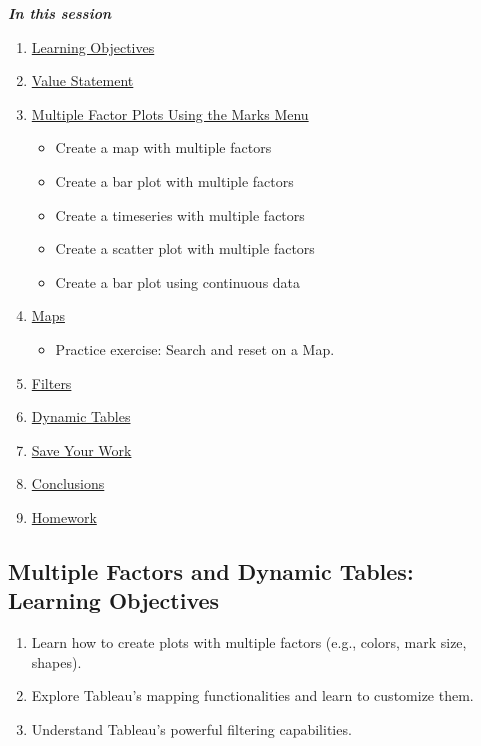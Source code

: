 \documentclass[
]{book}
\providecommand{\tightlist}{%
  \setlength{\itemsep}{0pt}\setlength{\parskip}{0pt}}
\begin{document}
\textbf{\emph{In this session }}

\begin{enumerate}
\def\labelenumi{\arabic{enumi}.}
\tightlist
\item
  \protect\hyperlink{multiple-factors-and-dynamic-tables-learning-objectives}{Learning Objectives}
\item
  \protect\hyperlink{multiple-factors-and-dynamic-tables-value-statement}{Value Statement}
\item
  \protect\hyperlink{multiple-factor-plots-using-the-marks-menu}{Multiple Factor Plots Using the Marks Menu}

  \begin{itemize}
  \tightlist
  \item
    Create a map with multiple factors
  \item
    Create a bar plot with multiple factors
  \item
    Create a timeseries with multiple factors
  \item
    Create a scatter plot with multiple factors
  \item
    Create a bar plot using continuous data
  \end{itemize}
\item
  \protect\hyperlink{maps}{Maps}

  \begin{itemize}
  \tightlist
  \item
    Practice exercise: Search and reset on a Map.
  \end{itemize}
\item
  \protect\hyperlink{filters}{Filters}
\item
  \protect\hyperlink{dynamic-tables}{Dynamic Tables}
\item
  \protect\hyperlink{save-your-work}{Save Your Work}
\item
  \protect\hyperlink{conclusions}{Conclusions}
\item
  \protect\hyperlink{homework}{Homework}
\end{enumerate}

\hypertarget{multiple-factors-and-dynamic-tables-learning-objectives}{%
\subsection{Multiple Factors and Dynamic Tables: Learning Objectives}\label{multiple-factors-and-dynamic-tables-learning-objectives}}

\begin{enumerate}
\def\labelenumi{\arabic{enumi}.}
\tightlist
\item
  Learn how to create plots with multiple factors (e.g., colors, mark size, shapes).
\item
  Explore Tableau's mapping functionalities and learn to customize them.
\item
  Understand Tableau's powerful filtering capabilities.
\end{enumerate}
\end{document}
